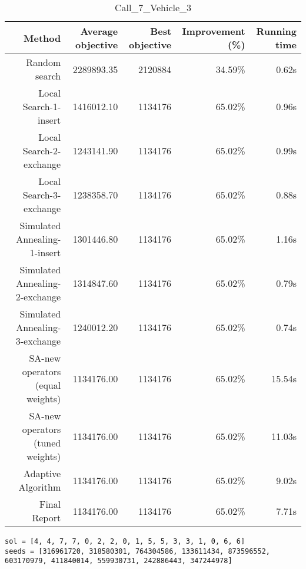 \begin{table}[ht]
\centering
\caption{Call\_7\_Vehicle\_3}
\label{tab:call7vehicle3}
\begin{tabular}{|r|r|r|r|r|}
Method & Average objective & Best objective & Improvement (\%) & Running time \\
\hline
Random search & 2289893.35 & 2120884 & 34.59\% & 0.62s\\
Local Search-1-insert & 1416012.10 & 1134176 & 65.02\% & 0.96s\\
Local Search-2-exchange & 1243141.90 & 1134176 & 65.02\% & 0.99s\\
Local Search-3-exchange & 1238358.70 & 1134176 & 65.02\% & 0.88s\\
Simulated Annealing-1-insert & 1301446.80 & 1134176 & 65.02\% & 1.16s\\
Simulated Annealing-2-exchange & 1314847.60 & 1134176 & 65.02\% & 0.79s\\
Simulated Annealing-3-exchange & 1240012.20 & 1134176 & 65.02\% & 0.74s\\
SA-new operators (equal weights) & 1134176.00 & 1134176 & 65.02\% & 15.54s\\
SA-new operators (tuned weights) & 1134176.00 & 1134176 & 65.02\% & 11.03s\\
Adaptive Algorithm & 1134176.00 & 1134176 & 65.02\% & 9.02s\\
Final Report & 1134176.00 & 1134176 & 65.02\% & 7.71s\\
\end{tabular}%
\end{table}
\begin{lstlisting}[label={lst:call7vehicle3},caption=Optimal solution call\_7\_vehicle\_3]
sol = [4, 4, 7, 7, 0, 2, 2, 0, 1, 5, 5, 3, 3, 1, 0, 6, 6]
seeds = [316961720, 318580301, 764304586, 133611434, 873596552, 603170979, 411840014, 559930731, 242886443, 347244978]
\end{lstlisting}%
\clearpage


